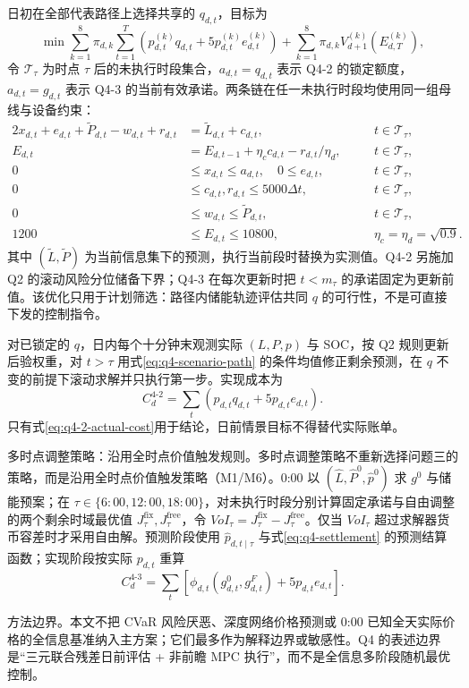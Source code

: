 日初在全部代表路径上选择共享的 $q_{d,t}$，目标为
\begin{equation}
\min \sum_{k=1}^{8}\pi_{d,k}\sum_{t=1}^{T}
\left(p^{(k)}_{d,t}q_{d,t}+5p^{(k)}_{d,t}e^{(k)}_{d,t}\right)
+\sum_{k=1}^{8}\pi_{d,k}V^{(k)}_{d+1}(E^{(k)}_{d,T}),
\label{eq:q4-2-dayahead}
\end{equation}
令 $\mathcal T_\tau$ 为时点 $\tau$ 后的未执行时段集合，$a_{d,t}=q_{d,t}$ 表示 Q4-2 的锁定额度，$a_{d,t}=g_{d,t}$ 表示 Q4-3 的当前有效承诺。两条链在任一未执行时段均使用同一组母线与设备约束：
\begin{alignat}{2}
x_{d,t}+e_{d,t}+\widetilde P_{d,t}-w_{d,t}+r_{d,t}&=\widetilde L_{d,t}+c_{d,t}, &&\quad t\in\mathcal T_\tau,\label{eq:q4-balance}\\
E_{d,t}&=E_{d,t-1}+\eta_cc_{d,t}-r_{d,t}/\eta_d, &&\quad t\in\mathcal T_\tau,\label{eq:q4-soc}\\
0&\le x_{d,t}\le a_{d,t},\quad 0\le e_{d,t}, &&\quad t\in\mathcal T_\tau,\nonumber\\[-2pt]
0&\le c_{d,t},r_{d,t}\le5000\Delta t, &&\quad t\in\mathcal T_\tau,\nonumber\\[-2pt]
0&\le w_{d,t}\le\widetilde P_{d,t}, &&\quad t\in\mathcal T_\tau,\nonumber\\[-2pt]
1200&\le E_{d,t}\le10800, &&\quad \eta_c=\eta_d=\sqrt{0.9}.\label{eq:q4-physical-limit}
\end{alignat}
其中 $(\widetilde L,\widetilde P)$ 为当前信息集下的预测，执行当前段时替换为实测值。Q4-2 另施加 Q2 的滚动风险分位储备下界；Q4-3 在每次更新时把 $t<m_\tau$ 的承诺固定为更新前值。该优化只用于计划筛选：路径内储能轨迹评估共同 $q$ 的可行性，不是可直接下发的控制指令。

对已锁定的 $q$，日内每个十分钟末观测实际 $(L,P,p)$ 与 SOC，按 Q2 规则更新后验权重，对 $t>\tau$ 用式\eqref{eq:q4-scenario-path} 的条件均值修正剩余预测，在 $q$ 不变的前提下滚动求解并只执行第一步。实现成本为
\begin{equation}
C^{4\text{-}2}_d=\sum_t\left(p_{d,t}q_{d,t}+5p_{d,t}e_{d,t}\right).
\label{eq:q4-2-actual-cost}
\end{equation}
只有式\eqref{eq:q4-2-actual-cost}用于结论，日前情景目标不得替代实际账单。

\noindent 多时点调整策略：沿用全时点价值触发规则。多时点调整策略不重新选择问题三的策略，而是沿用全时点价值触发策略（M1/M6）。0:00 以 $(\widehat L,\widehat P^0,\widehat p^0)$ 求 $g^0$ 与储能预案；在 $\tau\in\{6{:}00,12{:}00,18{:}00\}$，对未执行时段分别计算固定承诺与自由调整的两个剩余时域最优值 $J^{\mathrm{fix}}_\tau,J^{\mathrm{free}}_\tau$，令 $VoI_\tau=J^{\mathrm{fix}}_\tau-J^{\mathrm{free}}_\tau$。仅当 $VoI_\tau$ 超过求解器货币容差时才采用自由解。预测阶段使用 $\widehat p_{d,t\mid\tau}$ 与式\eqref{eq:q4-settlement} 的预测结算函数；实现阶段按实际 $p_{d,t}$ 重算
\begin{equation}
C^{4\text{-}3}_d=\sum_t\left[\phi_{d,t}(g^0_{d,t},g^F_{d,t})+5p_{d,t}e_{d,t}\right].
\label{eq:q4-3-actual-cost}
\end{equation}

\noindent 方法边界。本文不把 CVaR 风险厌恶、深度网络价格预测或 0:00 已知全天实际价格的全信息基准纳入主方案；它们最多作为解释边界或敏感性。Q4 的表述边界是“三元联合残差日前评估 + 非前瞻 MPC 执行”，而不是全信息多阶段随机最优控制。
